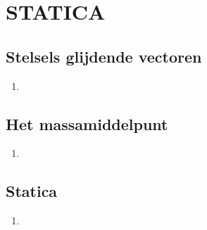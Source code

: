 \documentclass[12pt]{article}
\begin{document}
    \maketitle

    \section{STATICA}
    \subsection{Stelsels glijdende vectoren}
    \begin{enumerate}
        \item 
    \end{enumerate}
    \subsection{Het massamiddelpunt}
    \begin{enumerate}
        \item 
    \end{enumerate}
    \subsection{Statica}
    \begin{enumerate}
        \item 
    \end{enumerate}
\end{document}
